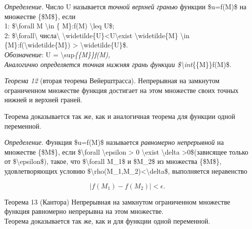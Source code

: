 \documentclass[
]{article}
\begin{document}
\emph{Определение}. Число U называется \emph{точной верхней гранью}
функции \$u=f(M)\$ на множестве \{\$M\$\}, если \\
1: \$\textbackslash forall M \textbackslash in \{ M\}:f(M)
\textbackslash leq U\$;\\
2: \$\textbackslash forall\textbackslash{} числа\textbackslash{}
\textbackslash widetilde\{U\}\textless U\textbackslash exist
\textbackslash widetilde\{M\} \textbackslash in
\{M\}:f(\textbackslash widetilde\{M\}) \textgreater{}
\textbackslash widetilde\{U\}\$.\\
\emph{Обозначение}: U = \textbackslash sup\emph{\{\{M\}\}f(M),\\
Аналогично определяется точная нижняя грань функции
\$\textbackslash int}\{\{M\}\}f(M)\$.

\emph{Теорема 12} (вторая теорема Вейерштрасса). Непрерывная на
замкнутом ограниченном множестве функция достигает на этом множестве
своих точных нижней и верхней граней.

Теорема доказывается так же, как и аналогичная теорема для функции одной
переменной.

\emph{Определение}. Функция \$u=f(M)\$ называется \emph{равномерно
непрерывной} на множестве \{\$M\$\}, если \$\textbackslash forall
\textbackslash epsilon \textgreater{} 0 \textbackslash exist
\textbackslash delta \textgreater0\$(зависящее только от
\$\textbackslash epsilon\$), такое, что \$\textbackslash forall M\_1\$ и
\$M\_2\$ из множества \{\$M\$\}, удовлетворяющих условию
\$\textbackslash rho(M\_1,M\_2)\textless\textbackslash delta\$,
выполняется неравенство

\[|f(M_1) - f(M_2)| < \epsilon.\]

Теорема 13 (Кантора) Непрерывная на замкнутом ограниченном множестве
функция равномерно непрерывна на этом множестве.\\
Теорема доказывается так же, как и для функции одной переменной.
\end{document}
